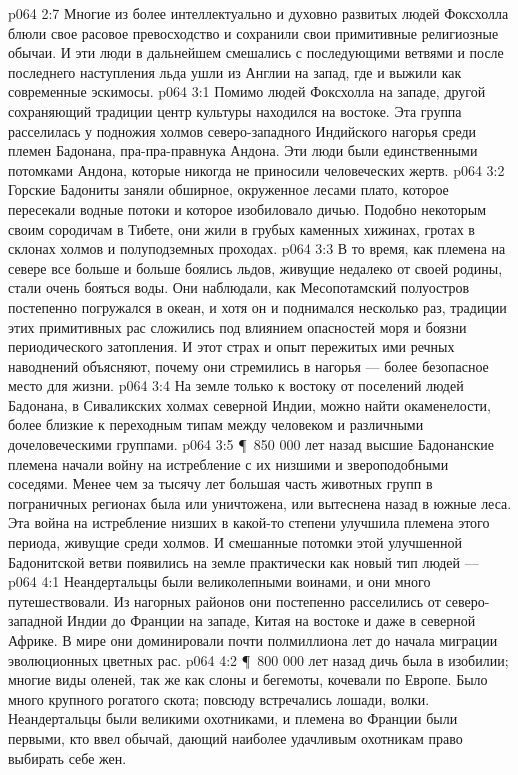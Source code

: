 \vs p064 2:7 Многие из более интеллектуально и духовно развитых людей Фоксхолла блюли свое расовое превосходство и сохранили свои примитивные религиозные обычаи. И эти люди в дальнейшем смешались с последующими ветвями и после последнего наступления льда ушли из Англии на запад, где и выжили как современные эскимосы.
\vs p064 3:1 Помимо людей Фоксхолла на западе, другой сохраняющий традиции центр культуры находился на востоке. Эта группа расселилась у подножия холмов северо\hyp{}западного Индийского нагорья среди племен Бадонана, пра\hyp{}пра\hyp{}правнука Андона. Эти люди были единственными потомками Андона, которые никогда не приносили человеческих жертв.
\vs p064 3:2 Горские Бадониты заняли обширное, окруженное лесами плато, которое пересекали водные потоки и которое изобиловало дичью. Подобно некоторым своим сородичам в Тибете, они жили в грубых каменных хижинах, гротах в склонах холмов и полуподземных проходах.
\vs p064 3:3 В то время, как племена на севере все больше и больше боялись льдов, живущие недалеко от своей родины, стали очень бояться воды. Они наблюдали, как Месопотамский полуостров постепенно погружался в океан, и хотя он и поднимался несколько раз, традиции этих примитивных рас сложились под влиянием опасностей моря и боязни периодического затопления. И этот страх и опыт пережитых ими речных наводнений объясняют, почему они стремились в нагорья --- более безопасное место для жизни.
\vs p064 3:4 На земле только к востоку от поселений людей Бадонана, в Сиваликских холмах северной Индии, можно найти окаменелости, более близкие к переходным типам между человеком и различными дочеловеческими группами.
\vs p064 3:5 \P\ 850 000 лет назад высшие Бадонанские племена начали войну на истребление с их низшими и звероподобными соседями. Менее чем за тысячу лет большая часть животных групп в пограничных регионах была или уничтожена, или вытеснена назад в южные леса. Эта война на истребление низших в какой\hyp{}то степени улучшила племена этого периода, живущие среди холмов. И смешанные потомки этой улучшенной Бадонитской ветви появились на земле практически как новый тип людей --- 
\vs p064 4:1 Неандертальцы были великолепными воинами, и они много путешествовали. Из нагорных районов они постепенно расселились от северо\hyp{}западной Индии до Франции на западе, Китая на востоке и даже в северной Африке. В мире они доминировали почти полмиллиона лет до начала миграции эволюционных цветных рас.
\vs p064 4:2 \P\ 800 000 лет назад дичь была в изобилии; многие виды оленей, так же как слоны и бегемоты, кочевали по Европе. Было много крупного рогатого скота; повсюду встречались лошади, волки. Неандертальцы были великими охотниками, и племена во Франции были первыми, кто ввел обычай, дающий наиболее удачливым охотникам право выбирать себе жен.

